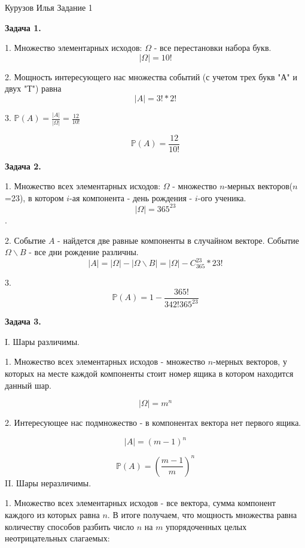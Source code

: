 \documentclass[12pt]{article}
\begin{document}
\begin{center}
{Курузов Илья}
{Задание 1}
\end{center}

\begin{center}
\textbf{Задача 1.}
\end{center}

1. Множество элементарных исходов: $\Omega$ - все перестановки набора букв. 
$$|\Omega|=10!$$

2. Мощность интересующего нас множества событий (с учетом трех букв "А" и двух "Т") равна $$|A| = 3!*2!$$

3. $\mathbb{P}(A) = \frac{|A|}{|\Omega|} = \frac{12}{10!} $

$$\boxed{\mathbb{P}(A) = \frac{12}{10!} }$$

\begin{center}
\textbf{Задача 2.}
\end{center}

1. Множество всех элементарных исходов: $\Omega$ - множество $n$-мерных векторов($n$=23), в котором $i$-ая компонента - день рождения - $i$-ого ученика. $$|\Omega| = 365^{23}$$.

2. Событие $A$ - найдется две равные компоненты в случайном векторе. Событие $\Omega\backslash B$ - все дни рождение различны. $$|A| = |\Omega| - |\Omega\backslash B|= |\Omega| - C_{365}^{23}*23!$$

3. $$\boxed{\mathbb{P}(A) = 1 - \frac{365!}{342!365^{23}}}$$

\begin{center}
\textbf{Задача 3.}
\end{center}

I. Шары различимы.

1. Множество всех элементарных исходов - множество $n$-мерных векторов, у которых на месте каждой компоненты стоит номер ящика в котором находится данный шар.

$$|\Omega| = m^n$$

2. Интересующее нас подмножество - в компонентах вектора нет первого ящика.

$$|A|=(m-1)^n$$

$$\boxed{\mathbb{P}(A)=\left(\frac{m-1}{m}\right)^n}$$
II. Шары неразличимы.

1. Множество всех элементарных исходов - все вектора, сумма компонент каждого из которых равна $n$. В итоге получаем, что мощность множества равна количеству способов разбить число $n$ на $m$ упорядоченных целых неотрицательных слагаемых:
\end{document}
